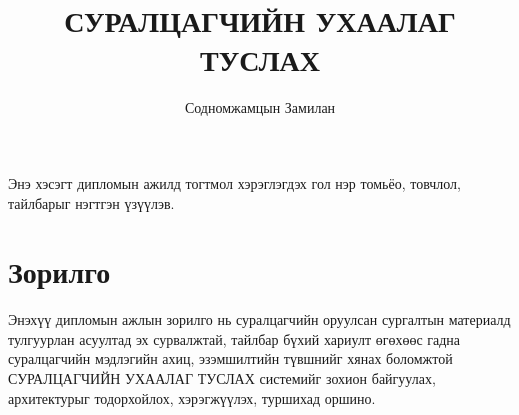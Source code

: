 \documentclass[12pt,A4]{report}
\begin{document}
\fontsize{12pt}{14.4pt}\selectfont



\title{СУРАЛЦАГЧИЙН УХААЛАГ ТУСЛАХ}
\author{Содномжамцын Замилан}








Энэ хэсэгт дипломын ажилд тогтмол хэрэглэгдэх гол нэр томьёо, товчлол, тайлбарыг нэгтгэн үзүүлэв.



\section*{Зорилго}

Энэхүү дипломын ажлын зорилго нь суралцагчийн оруулсан сургалтын материалд тулгуурлан асуултад эх сурвалжтай, тайлбар бүхий хариулт өгөхөөс гадна суралцагчийн мэдлэгийн ахиц, эзэмшилтийн түвшнийг хянах боломжтой СУРАЛЦАГЧИЙН УХААЛАГ ТУСЛАХ системийг зохион байгуулах, архитектурыг тодорхойлох, хэрэгжүүлэх, туршихад оршино.
\end{document}
